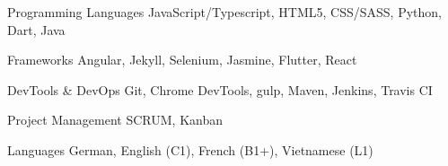 
\begin{cvskills}

  \cvskill
    {Programming Languages} %
    {JavaScript/Typescript, HTML5, CSS/SASS, Python, Dart, Java} %

  \cvskill
    {Frameworks} %
    {Angular, Jekyll, Selenium, Jasmine, Flutter, React} %

  \cvskill
    {DevTools \& DevOps} %
    {Git, Chrome DevTools, gulp, Maven, Jenkins, Travis CI} %

  \cvskill
    {Project Management} %
    {SCRUM, Kanban} %

  \cvskill
    {Languages} %
    {German, English (C1), French (B1+), Vietnamese (L1)} %

\end{cvskills}
